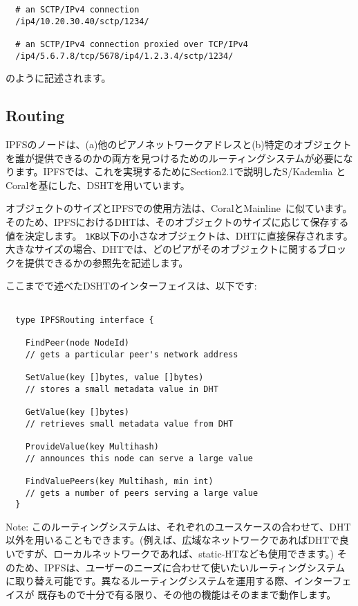\documentclass{sig-alternate}
\begin{document}
\begin{verbatim}
  # an SCTP/IPv4 connection
  /ip4/10.20.30.40/sctp/1234/

  # an SCTP/IPv4 connection proxied over TCP/IPv4
  /ip4/5.6.7.8/tcp/5678/ip4/1.2.3.4/sctp/1234/
\end{verbatim}

のように記述されます。

\subsection{Routing}

IPFSのノードは、(a)他のピアノネットワークアドレスと(b)特定のオブジェクトを誰が提供できるのかの両方を見つけるためのルーティングシステムが必要になります。IPFSでは、これを実現するためにSection2.1で説明したS/Kademlia と Coralを基にした、DSHTを用いています。

オブジェクトのサイズとIPFSでの使用方法は、Coral\cite{freedman04}とMainline~\cite{wang13}に似ています。そのため、IPFSにおけるDHTは、そのオブジェクトのサイズに応じて保存する値を決定します。 \texttt{1KB}以下の小さなオブジェクトは、DHTに直接保存されます。大きなサイズの場合、DHTでは、どのピアがそのオブジェクトに関するブロックを提供できるかの参照先を記述します。

ここまでで述べたDSHTのインターフェイスは、以下です:
\begin{verbatim}

  type IPFSRouting interface {

    FindPeer(node NodeId)
    // gets a particular peer's network address

    SetValue(key []bytes, value []bytes)
    // stores a small metadata value in DHT

    GetValue(key []bytes)
    // retrieves small metadata value from DHT

    ProvideValue(key Multihash)
    // announces this node can serve a large value

    FindValuePeers(key Multihash, min int)
    // gets a number of peers serving a large value
  }
\end{verbatim}

Note: このルーティングシステムは、それぞれのユースケースの合わせて、DHT以外を用いることもできます。(例えば、広域なネットワークであればDHTで良いですが、ローカルネットワークであれば、static-HTなども使用できます。) そのため、IPFSは、ユーザーのニーズに合わせて使いたいルーティングシステムに取り替え可能です。異なるルーティングシステムを運用する際、インターフェイスが
既存もので十分で有る限り、その他の機能はそのままで動作します。
\end{document}
